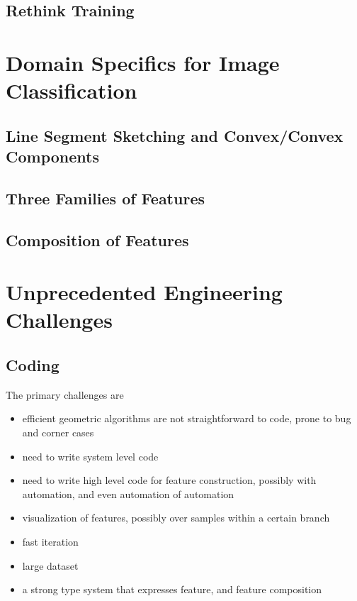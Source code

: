 \documentclass[11pt]{article} 	%
\theoremstyle{definition}
\begin{document}
\subsection{Rethink Training}



\section{Domain Specifics for Image Classification}

\subsection{Line Segment Sketching and Convex/Convex Components}

\subsection{Three Families of Features}

\subsection{Composition of Features}



\section{Unprecedented Engineering Challenges}

\subsection{Coding}

The primary challenges are

\begin{itemize}
	\item efficient geometric algorithms are not straightforward to code, prone to bug and corner cases
	\item need to write system level code
	\item need to write high level code for feature construction, possibly with automation, and even automation of automation
	\item visualization of features, possibly over samples within a certain branch
	\item fast iteration
	\item large dataset
	\item a strong type system that expresses feature, and feature composition
\end{itemize}
\end{document}
